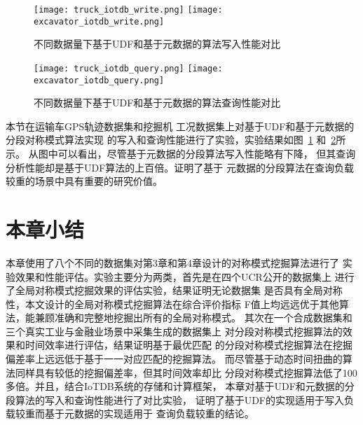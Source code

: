 \begin{figure}
  \centering
  {\texttt{[image: truck\_iotdb\_write.png]}}
  {\texttt{[image: excavator\_iotdb\_write.png]}}
  \caption{不同数据量下基于UDF和基于元数据的算法写入性能对比}
  \label{fig:iotdb_write}
\end{figure}

\begin{figure}
\centering
{}
{\texttt{[image: truck\_iotdb\_query.png]}}
{\texttt{[image: excavator\_iotdb\_query.png]}}
\caption{不同数据量下基于UDF和基于元数据的算法查询性能对比}
\label{fig:iotdb_query}
\end{figure}

本节在运输车GPS轨迹数据集和挖掘机
工况数据集上对基于UDF和基于元数据的分段对称模式算法实现
的写入和查询性能进行了实验，实验结果如图~\ref{fig:iotdb_write}
和~\ref{fig:iotdb_query}所示。
从图中可以看出，尽管基于元数据的分段算法写入性能略有下降，
但其查询分析性能却是基于UDF算法的上百倍。证明了基于
元数据的分段算法在查询负载较重的场景中具有重要的研究价值。

\section{本章小结}
本章使用了八个不同的数据集对第3章和第4章设计的对称模式挖掘算法进行了
实验效果和性能评估。实验主要分为两类，首先是在四个UCR公开的数据集上
进行了全局对称模式挖掘效果的评估实验，结果证明无论数据集
是否具有全局对称性，本文设计的全局对称模式挖掘算法在综合评价指标
F值上均远远优于其他算法，能兼顾准确和完整地挖掘出所有的全局对称模式。
其次在一个合成数据集和三个真实工业与金融业场景中采集生成的数据集上
对分段对称模式挖掘算法的效果和时间效率进行评估，结果证明基于最优匹配
的分段对称模式挖掘算法在挖掘偏差率上远远低于基于一一对应匹配的挖掘算法。
而尽管基于动态时间扭曲的算法同样具有较低的挖掘偏差率，但其时间效率却比
分段对称模式挖掘算法低了100多倍。并且，结合IoTDB系统的存储和计算框架，
本章对基于UDF和元数据的分段算法的写入和查询性能进行了对比实验，
证明了基于UDF的实现适用于写入负载较重而基于元数据的实现适用于
查询负载较重的结论。
